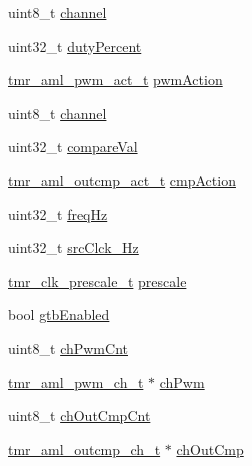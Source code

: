 \begin{DoxyCompactItemize}
\item 
uint8\+\_\+t \mbox{\hyperlink{group__globals__group_ga715f5cb061d11eb75981741eda4dafcd}{channel}}
\item 
uint32\+\_\+t \mbox{\hyperlink{group__globals__group_gac5d6008f628917520f517667b6ff290f}{duty\+Percent}}
\item 
\mbox{\hyperlink{group__enum__group_ga6ce2dec1c04ab59872ebaf44bd4f4682}{tmr\+\_\+aml\+\_\+pwm\+\_\+act\+\_\+t}} \mbox{\hyperlink{group__globals__group_gaf500180d9ca339fd69d69b52db442b74}{pwm\+Action}}
\item 
uint8\+\_\+t \mbox{\hyperlink{group__globals__group_ga715f5cb061d11eb75981741eda4dafcd}{channel}}
\item 
uint32\+\_\+t \mbox{\hyperlink{group__globals__group_gad34053d0dd1f608826c1afdf92427692}{compare\+Val}}
\item 
\mbox{\hyperlink{group__enum__group_ga50dbf45b245f7b30d865189716b25db5}{tmr\+\_\+aml\+\_\+outcmp\+\_\+act\+\_\+t}} \mbox{\hyperlink{group__globals__group_gaba939de9e86521e98f097d6a761f5b59}{cmp\+Action}}
\item 
uint32\+\_\+t \mbox{\hyperlink{group__globals__group_gad93992caaee2a5d6d2e0d2df4313a07f}{freq\+Hz}}
\item 
uint32\+\_\+t \mbox{\hyperlink{group__globals__group_ga4386243efbc69e706d1811c2e66da6fc}{src\+Clck\+\_\+\+Hz}}
\item 
\mbox{\hyperlink{group__enum__group_ga89574487805ce2171aa6f0168a3359a0}{tmr\+\_\+clk\+\_\+prescale\+\_\+t}} \mbox{\hyperlink{group__globals__group_gad3bdd8ae4e264dd89622660e550b16fc}{prescale}}
\item 
bool \mbox{\hyperlink{group__globals__group_gadc7a8cd026c457aa793b22295fef7373}{gtb\+Enabled}}
\item 
uint8\+\_\+t \mbox{\hyperlink{group__globals__group_ga3958cb513ef18a35e622c66e94fc99ea}{ch\+Pwm\+Cnt}}
\item 
\mbox{\hyperlink{structtmr__aml__pwm__ch__t}{tmr\+\_\+aml\+\_\+pwm\+\_\+ch\+\_\+t}} $\ast$ \mbox{\hyperlink{group__globals__group_ga4adfc517ee2b4d31e619344efd325f0e}{ch\+Pwm}}
\item 
uint8\+\_\+t \mbox{\hyperlink{group__globals__group_gaf1d6b2bc4b34fa572c7d75c01b9ee9a7}{ch\+Out\+Cmp\+Cnt}}
\item 
\mbox{\hyperlink{structtmr__aml__outcmp__ch__t}{tmr\+\_\+aml\+\_\+outcmp\+\_\+ch\+\_\+t}} $\ast$ \mbox{\hyperlink{group__globals__group_ga520708f7473b24225c209d85ad776794}{ch\+Out\+Cmp}}
\end{DoxyCompactItemize}


